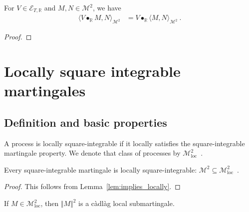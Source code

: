 \begin{lemma}\label{lem:inner_elemStochIntegral}
For $V \in \mathcal{E}_{T, \mathbb{R}}$ and $M, N \in \mathcal{M}^2$, we have
\begin{align*}
  \langle V \bullet_{\mathbb{R}} M, N \rangle_{\mathcal{M}^2}
  &= V \bullet_{\mathbb{R}} \langle M, N \rangle_{\mathcal{M}^2}
  \: .
\end{align*}
\end{lemma}

\begin{proof}

\end{proof}



\section{Locally square integrable martingales}

\subsection{Definition and basic properties}

\begin{definition}\label{def:IsLocallySquareIntegrable}
  \leanok
A process is locally square-integrable if it locally satisfies the square-integrable martingale property.
We denote that class of processes by $\mathcal{M}^2_{\mathrm{loc}}$~.
\end{definition}


\begin{lemma}\label{lem:IsSquareIntegrable.isLocallySquareIntegrable}
  \leanok
Every square-integrable martingale is locally square-integrable: $\mathcal{M}^2 \subseteq \mathcal{M}^2_{\mathrm{loc}}$~.
\end{lemma}

\begin{proof}\leanok
This follows from Lemma~\ref{lem:implies_locally}.
\end{proof}


\begin{lemma}\label{lem:IsLocallySquareIntegrable.isLocalSubmartingale_sq_norm}
  \leanok
If $M \in \mathcal{M}^2_{\mathrm{loc}}$, then $\Vert M \Vert^2$ is a càdlàg local submartingale.
\end{lemma}

